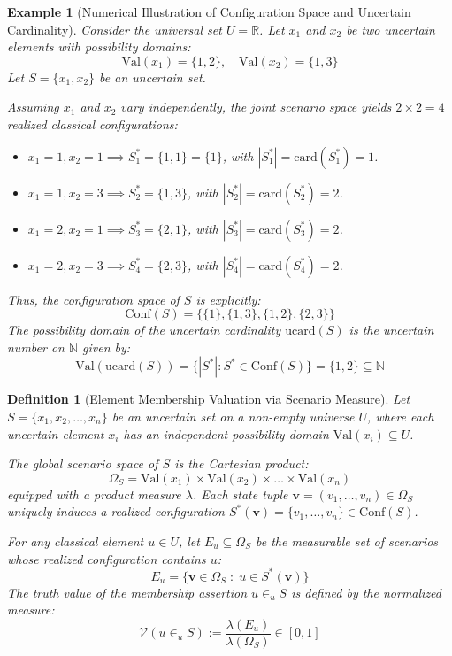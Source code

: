 \documentclass[a4paper,14pt, twoside]{memoir}
\newtheorem{definition}{Definition}[chapter]
\newtheorem{example}{Example}[chapter]
\begin{document}
	\begin{example}[Numerical Illustration of Configuration Space and Uncertain Cardinality]
		Consider the universal set $U = \mathbb{R}$. Let $x_1$ and $x_2$ be two uncertain elements with possibility domains:
		\[
		\mathrm{Val}(x_1) = \{1, 2\}, \quad \mathrm{Val}(x_2) = \{1, 3\}
		\]
		Let $S = \{x_1, x_2\}$ be an uncertain set.
		
		Assuming $x_1$ and $x_2$ vary independently, the joint scenario space yields $2 \times 2 = 4$ realized classical configurations:
		\begin{itemize}
			\item $x_1 = 1, x_2 = 1 \implies S_1^* = \{1, 1\} = \{1\}$, with $|S_1^*| = \mathrm{card}(S_1^*) = 1$.
			\item $x_1 = 1, x_2 = 3 \implies S_2^* = \{1, 3\}$, with $|S_2^*| = \mathrm{card}(S_2^*) = 2$.
			\item $x_1 = 2, x_2 = 1 \implies S_3^* = \{2, 1\}$, with $|S_3^*| = \mathrm{card}(S_3^*) = 2$.
			\item $x_1 = 2, x_2 = 3 \implies S_4^* = \{2, 3\}$, with $|S_4^*| = \mathrm{card}(S_4^*) = 2$.
		\end{itemize}
		
		Thus, the configuration space of $S$ is explicitly:
		\[
		\mathrm{Conf}(S) = \big\{ \{1\}, \{1, 3\}, \{1, 2\}, \{2, 3\} \big\}
		\]
		The possibility domain of the uncertain cardinality $\mathrm{ucard}(S)$ is the uncertain number on $\mathbb{N}$ given by:
		\[
		\mathrm{Val}(\mathrm{ucard}(S)) = \{ |S^*| : S^* \in \mathrm{Conf}(S) \} = \{1, 2\} \subseteq \mathbb{N}
		\]
	\end{example}
	
	\begin{definition}[Element Membership Valuation via Scenario Measure]
		Let $S = \{x_1, x_2, \dots, x_n\}$ be an uncertain set on a non-empty universe $U$, where each uncertain element $x_i$ has an independent possibility domain $\mathrm{Val}(x_i) \subseteq U$. 
		
		The global scenario space of $S$ is the Cartesian product:
		\[
		\Omega_S = \mathrm{Val}(x_1) \times \mathrm{Val}(x_2) \times \dots \times \mathrm{Val}(x_n)
		\]
		equipped with a product measure $\lambda$. Each state tuple $\mathbf{v} = (v_1, \dots, v_n) \in \Omega_S$ uniquely induces a realized configuration $S^*(\mathbf{v}) = \{v_1, \dots, v_n\} \in \mathrm{Conf}(S)$.
		
		For any classical element $u \in U$, let $E_u \subseteq \Omega_S$ be the measurable set of scenarios whose realized configuration contains $u$:
		\[
		E_u = \{\mathbf{v} \in \Omega_S \;:\; u \in S^*(\mathbf{v})\}
		\]
		The truth value of the membership assertion $u \in_u S$ is defined by the normalized measure:
		\[
		\mathcal{V}(u \in_u S) := \frac{\lambda(E_u)}{\lambda(\Omega_S)} \in [0, 1]
		\]
	\end{definition}
	
\end{document}
